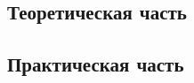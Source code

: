 \documentclass[a4paper,14pt]{extarticle}
\begin{document}

\newpage

\tableofcontents

\newpage

\begin{centering}
\section{Теоретическая часть}
\end{centering}












% 

\newpage

\begin{centering}
    \section{Практическая часть}
\end{centering}





\newpage
\printbibliography
\end{document}
